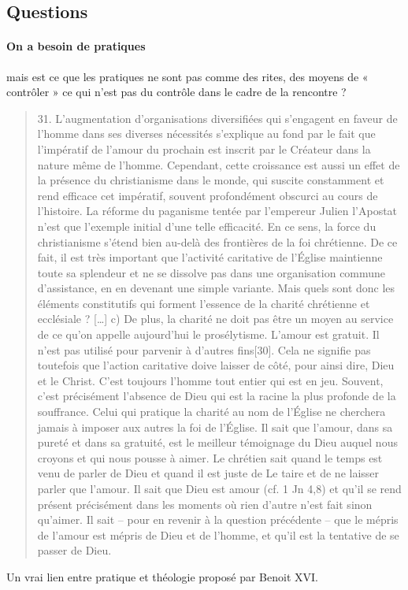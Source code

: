 \subsection{Questions}

\paragraph{On a besoin de pratiques} mais est ce que les pratiques ne sont pas comme des rites, des moyens de « contrôler » ce qui n’est pas du contrôle dans le cadre de la rencontre ?

\begin{quote}
    31. L’augmentation d’organisations diversifiées qui s’engagent en faveur de l’homme dans ses diverses nécessités s’explique au fond par le fait que l’impératif de l’amour du prochain est inscrit par le Créateur dans la nature même de l’homme. Cependant, cette croissance est aussi un effet de la présence du christianisme dans le monde, qui suscite constamment et rend efficace cet impératif, souvent profondément obscurci au cours de l’histoire. La réforme du paganisme tentée par l’empereur Julien l’Apostat n’est que l’exemple initial d’une telle efficacité. En ce sens, la force du christianisme s’étend bien au-delà des frontières de la foi chrétienne. De ce fait, il est très important que l’activité caritative de l’Église maintienne toute sa splendeur et ne se dissolve pas dans une organisation commune d’assistance, en en devenant une simple variante. Mais quels sont donc les éléments constitutifs qui forment l’essence de la charité chrétienne et ecclésiale ?
    [\ldots]
    c) De plus, la charité ne doit pas être un moyen au service de ce qu’on appelle aujourd’hui le prosélytisme. L’amour est gratuit. Il n’est pas utilisé pour parvenir à d’autres fins[30]. Cela ne signifie pas toutefois que l’action caritative doive laisser de côté, pour ainsi dire, Dieu et le Christ. C’est toujours l’homme tout entier qui est en jeu. Souvent, c’est précisément l’absence de Dieu qui est la racine la plus profonde de la souffrance. Celui qui pratique la charité au nom de l’Église ne cherchera jamais à imposer aux autres la foi de l’Église. Il sait que l’amour, dans sa pureté et dans sa gratuité, est le meilleur témoignage du Dieu auquel nous croyons et qui nous pousse à aimer. Le chrétien sait quand le temps est venu de parler de Dieu et quand il est juste de Le taire et de ne laisser parler que l’amour. Il sait que Dieu est amour (cf. 1 Jn 4,8) et qu’il se rend présent précisément dans les moments où rien d’autre n’est fait sinon qu’aimer. Il sait – pour en revenir à la question précédente – que le mépris de l’amour est mépris de Dieu et de l’homme, et qu’il est la tentative de se passer de Dieu. 
\end{quote}
Un vrai lien entre pratique et théologie proposé par Benoit XVI.

